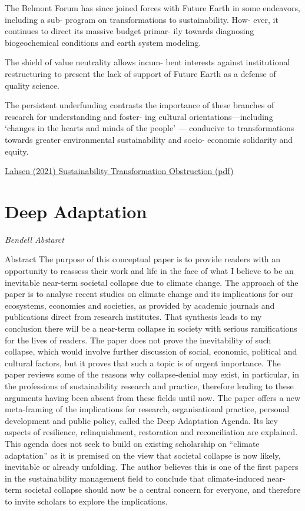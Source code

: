 \documentclass[
]{book}
\begin{document}
The Belmont Forum has since joined forces with
Future Earth in some endeavors, including a sub-
program on transformations to sustainability. How-
ever, it continues to direct its massive budget primar-
ily towards diagnosing biogeochemical conditions
and earth system modeling.

The shield of value neutrality allows incum-
bent interests against institutional restructuring to
present the lack of support of Future Earth as a
defense of quality science.

The persistent underfunding contrasts the importance of these
branches of research for understanding and foster-
ing cultural orientations---including `changes in the
hearts and minds of the people' --- conducive to transformations towards
greater environmental sustainability and socio-
economic solidarity and equity.

\href{pdf/Lahsen_2021_Sustainability_Obstruction.pdf}{Lahsen (2021) Sustainability Transformation Obstruction (pdf)}

\hypertarget{deep-adaptation-1}{%
\section{Deep Adaptation}\label{deep-adaptation-1}}

\emph{Bendell Abstarct}

Abstract
The purpose of this conceptual paper is to provide readers with an opportunity to reassess
their work and life in the face of what I believe to be an inevitable near-term societal collapse
due to climate change.
The approach of the paper is to analyse recent studies on climate change and its implications
for our ecosystems, economies and societies, as provided by academic journals and
publications direct from research institutes.
That synthesis leads to my conclusion there will be a near-term collapse in society with serious
ramifications for the lives of readers. The paper does not prove the inevitability of such
collapse, which would involve further discussion of social, economic, political and cultural
factors, but it proves that such a topic is of urgent importance. The paper reviews some of the
reasons why collapse-denial may exist, in particular, in the professions of sustainability
research and practice, therefore leading to these arguments having been absent from these
fields until now.
The paper offers a new meta-framing of the implications for research, organisational practice,
personal development and public policy, called the Deep Adaptation Agenda. Its key aspects
of resilience, relinquishment, restoration and reconciliation are explained. This agenda does
not seek to build on existing scholarship on ``climate adaptation'' as it is premised on the view
that societal collapse is now likely, inevitable or already unfolding.
The author believes this is one of the first papers in the sustainability management field to
conclude that climate-induced near-term societal collapse should now be a central concern for
everyone, and therefore to invite scholars to explore the implications.
\end{document}
